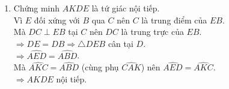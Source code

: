 \begin{vd}
{\begin{enumerate}
{
			}
		\vspace*{-0.2cm}
			\item Chứng minh $AKDE$ là tứ giác nội tiếp.\\
			Vì $E$ đối xứng với $B$ qua $C$ nên $C$ là trung điểm của $EB$.\\
			Mà $DC\perp EB$ tại $C$ nên $DC$ là trung trực của $EB$.\\
			$\Rightarrow DE=DB\Rightarrow \triangle DEB$ cân tại $D$.\\
			$\Rightarrow \widehat{AED}=\widehat{ABD}$.\\
			Mà $\widehat{AKC}=\widehat{ABD}$ (cùng phụ $\widehat{CAK}$) nên $\widehat{AED}=\widehat{AKC}$.\\
			$\Rightarrow AKDE$ nội tiếp.
		\end{enumerate}
		
	}
\end{vd}
